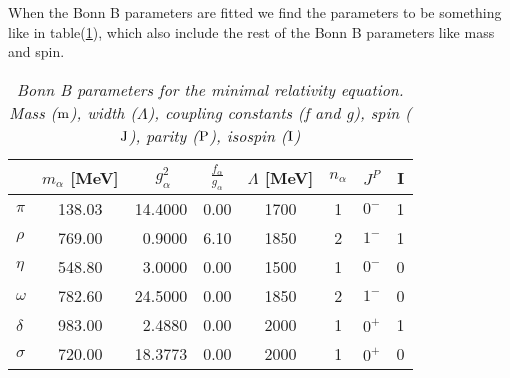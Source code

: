 When the Bonn B parameters are fitted we find the parameters to be something like in table(\ref{tabBonnBparametere}),
which also include the rest of the Bonn B parameters like mass and spin.
\begin{table}[!hbp]
\begin{tabular}{|l|c|r|c|c|c|c|c|}
\hline 
    & $m_\alpha$ [MeV]& $g_\alpha^2\quad$ &$\frac{f_\alpha}{g_\alpha}$&$\Lambda$ [MeV]&$n_\alpha$&$J^P$&I\\
\hline
$\pi$ & 138.03&14.4000&0.00&1700&1&$0^-$&1\\
\hline
$\rho$& 769.00&0.9000&6.10&1850&2&$1^-$&1\\
\hline
$\eta$& 548.80&3.0000&0.00&1500&1&$0^-$&0\\
\hline
$\omega$& 782.60&24.5000&0.00&1850&2&$1^-$&0\\
\hline
$\delta$& 983.00&2.4880&0.00&2000&1&$0^+$&1\\
\hline
$\sigma$& 720.00&18.3773&0.00&2000&1&$0^+$&0\\
\hline
\end{tabular}
\caption{
\label{tabBonnBparametere}
\sl Bonn B parameters for the minimal relativity equation. Mass (${{\text m}}$), 
width ($\Lambda$), coupling constants (f and g), spin (${{\text J}}$), parity (${{\text P}}$), isospin (${{\text I}}$) 
}
\end{table}
